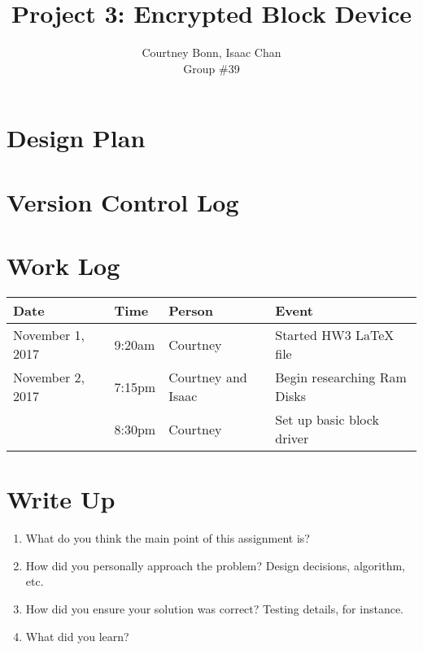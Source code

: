 \documentclass[letterpaper,10pt,draftclsnofoot,onecolumn,titlepage]{IEEEtran}
\def\name{Courtney Bonn, Isaac Chan}
\def\grp{Group \#39}
\begin{document}
\title{Project 3: Encrypted Block Device}
\author{\name \\ \grp}

\maketitle

\begin{abstract}
\end{abstract}

\section{Design Plan}
    
\section{Version Control Log}

\section{Work Log}
\begin{center}
\begin{tabular}{p{3cm}p{1cm}p{1cm}p{10cm} }
 Date  & Time & Person & Event \\ \hline
November 1, 2017 & 9:20am & Courtney & Started HW3 LaTeX file \\
November 2, 2017 & 7:15pm & Courtney and Isaac & Begin researching Ram Disks \\
		 & 8:30pm & Courtney & Set up basic block driver \\
\end{tabular}
\end{center}

\section{Write Up}
\begin{enumerate}
                \item What do you think the main point of this assignment is? \\
                \item How did you personally approach the problem? Design decisions, algorithm, etc. \\
                \item How did you ensure your solution was correct? Testing details, for instance.
                \item What did you learn?
\end{enumerate}
\end{document}
